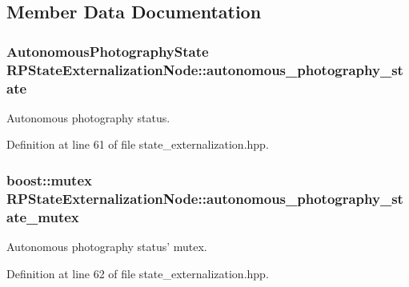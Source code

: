 \subsection{\-Member \-Data \-Documentation}
\hypertarget{class_r_p_state_externalization_node_abed06c00a68454ce196768a1e5078cee}{
\subsubsection[{autonomous\-\_\-photography\-\_\-state}]{\setlength{\rightskip}{0pt plus 5cm}\-Autonomous\-Photography\-State {\bf \-R\-P\-State\-Externalization\-Node\-::autonomous\-\_\-photography\-\_\-state}}}\label{class_r_p_state_externalization_node_abed06c00a68454ce196768a1e5078cee}
\-Autonomous photography status. 

\-Definition at line 61 of file state\-\_\-externalization.\-hpp.

\hypertarget{class_r_p_state_externalization_node_a3c18a6613c260be6d1d770c4553de508}{
\subsubsection[{autonomous\-\_\-photography\-\_\-state\-\_\-mutex}]{\setlength{\rightskip}{0pt plus 5cm}boost\-::mutex {\bf \-R\-P\-State\-Externalization\-Node\-::autonomous\-\_\-photography\-\_\-state\-\_\-mutex}}}\label{class_r_p_state_externalization_node_a3c18a6613c260be6d1d770c4553de508}
\-Autonomous photography status' mutex. 

\-Definition at line 62 of file state\-\_\-externalization.\-hpp.

